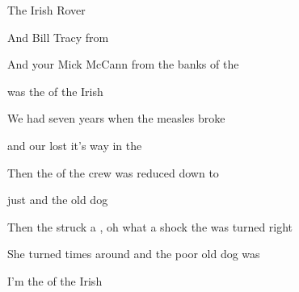 \begin{SBSong}{The Irish Rover}
\begin{SBVerse}
    And  Bill Tracy from 

    And your  Mick McCann from the banks of the 

    was the  of the Irish 
  \end{SBVerse}
  \CBPageBrk
  \begin{SBVerse}
    We had  seven years when the measles broke  

    and our  lost it's way in the 

    Then the  of the crew was reduced down to 

    just  and the  old dog

    Then the  struck a , oh  what a shock the  was turned right 

    She turned  times around and the poor old dog was  

    I'm the  of the Irish 
  \end{SBVerse}
\end{SBSong}
